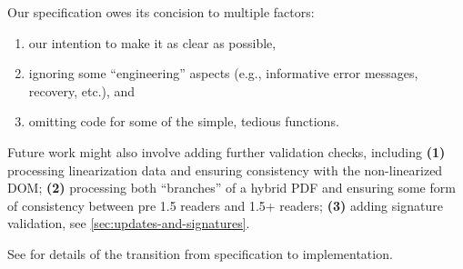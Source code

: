 Our specification owes its concision to multiple factors:
\begin{enumerate}
\item our intention to make it as clear as possible,
\item ignoring some ``engineering'' aspects (e.g., informative error
   messages, recovery, etc.), and
\item omitting code for some of the simple, tedious functions.
\end{enumerate}

Future work might also involve adding further validation checks,
including %
\textbf{(1)} processing linearization data and ensuring consistency
with the non-linearized DOM; %
\textbf{(2)} processing both ``branches'' of a hybrid PDF and ensuring
some form of consistency between pre 1.5 readers and 1.5+ readers; %
\textbf{(3)} adding signature validation, see
\cref{sec:updates-and-signatures}.

See  for details of the transition from specification
to implementation.


